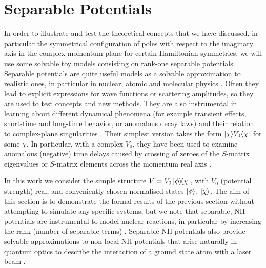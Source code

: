 \section{Separable Potentials}
\label{sec:chapter2_separablePotentials}
%
%
In order to illustrate and test the theoretical concepts that we have discussed, in particular the
symmetrical configuration of poles with respect to the imaginary axis in the complex momentum plane for certain Hamiltonian symmetries, we will use some solvable toy models consisting on rank-one separable potentials.
Separable potentials are quite useful models as a solvable approximation to realistic ones, in particular in nuclear, atomic and molecular physics \cite{Popov2019}.
Often they lead to explicit expressions
for wave functions or scattering amplitudes, so they are used to test concepts and new methods.
They are also instrumental in learning about different dynamical phenomena (for example transient effects, short-time and long-time behavior, or anomalous decay laws)  and their relation to complex-plane singularities
\cite{Muga1990,Muga1996,Muga1996a,Muga1998}. Their simplest version takes the form
$|\chi\rangle V_0\langle\chi|$ for some  $\chi$.   In particular, with a complex $V_0$,
they have been used to examine anomalous (negative) time delays caused by  crossing of zeroes of the $S$-matrix eigenvalues or $S$-matrix elements across the momentum real axis \cite{Muga1998a}.

In this work we consider the simple structure
$V=V_0 \ketbra{\phi}{\chi}$, with $V_0$ (potential strength) real, and conveniently chosen normalised states $\ket{\phi}$, $\ket{\chi}$.
The aim of this section is to demonstrate the formal results of the previous section without attempting to simulate any specific systems, but we note that separable, NH potentials are instrumental to model nuclear reactions, in particular  by increasing the rank (number of separable terms) \cite{Hlophe2017}.
Separable NH potentials also provide solvable approximations to non-local NH potentials that arise naturally in quantum optics to describe the interaction of a ground state atom with a laser beam \cite{Ruschhaupt2004a}.

